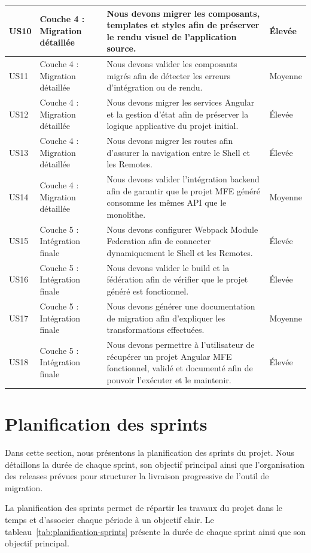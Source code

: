 \begin{longtable}{|P{1.0cm}|P{2.7cm}|P{6.6cm}|P{2.25cm}|}
\hline
US10 & Couche 4 : Migration détaillée & Nous devons migrer les composants, templates et styles afin de préserver le rendu visuel de l'application source. & Élevée \\
\hline
US11 & Couche 4 : Migration détaillée & Nous devons valider les composants migrés afin de détecter les erreurs d'intégration ou de rendu. & Moyenne \\
\hline
US12 & Couche 4 : Migration détaillée & Nous devons migrer les services Angular et la gestion d'état afin de préserver la logique applicative du projet initial. & Élevée \\
\hline
US13 & Couche 4 : Migration détaillée & Nous devons migrer les routes afin d'assurer la navigation entre le Shell et les Remotes. & Élevée \\
\hline
US14 & Couche 4 : Migration détaillée & Nous devons valider l'intégration backend afin de garantir que le projet MFE généré consomme les mêmes API que le monolithe. & Moyenne \\
\hline
US15 & Couche 5 : Intégration finale & Nous devons configurer Webpack Module Federation afin de connecter dynamiquement le Shell et les Remotes. & Élevée \\
\hline
US16 & Couche 5 : Intégration finale & Nous devons valider le build et la fédération afin de vérifier que le projet généré est fonctionnel. & Élevée \\
\hline
US17 & Couche 5 : Intégration finale & Nous devons générer une documentation de migration afin d'expliquer les transformations effectuées. & Moyenne \\
\hline
US18 & Couche 5 : Intégration finale & Nous devons permettre à l'utilisateur de récupérer un projet Angular MFE fonctionnel, validé et documenté afin de pouvoir l'exécuter et le maintenir. & Élevée \\
\hline
\end{longtable}
\setlength{\tabcolsep}{6pt}

\section{Planification des sprints}

Dans cette section, nous présentons la planification des sprints du projet. Nous détaillons la durée de chaque sprint, son objectif principal ainsi que l'organisation des releases prévues pour structurer la livraison progressive de l'outil de migration.

La planification des sprints permet de répartir les travaux du projet dans le temps et d'associer chaque période à un objectif clair. Le tableau~\ref{tab:planification-sprints} présente la durée de chaque sprint ainsi que son objectif principal.

